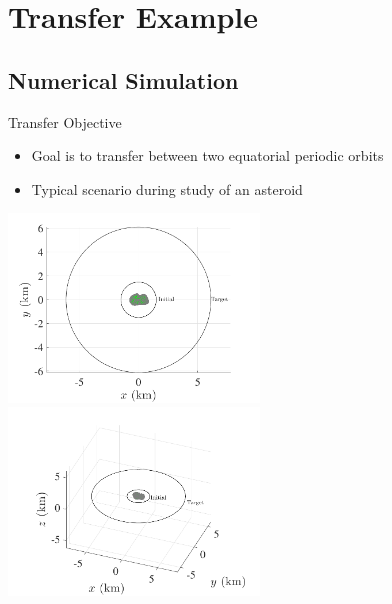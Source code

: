 \documentclass[11pt,professionalfonts]{beamer}
\begin{document}
\section*{Transfer Example}
\subsection*{Numerical Simulation}

\begin{frame}{Transfer Objective} %

\begin{itemize}
    \item Goal is to transfer between two equatorial periodic orbits
    \item Typical scenario during study of an asteroid
\end{itemize}

\begin{center}
    \includegraphics[width=0.5\textwidth]{figures/initial_transfer.pdf}
    \hfill
    \includegraphics[width=0.5\textwidth]{figures/initial_transfer_3d.pdf}
\end{center}

\end{frame}%
\end{document}
